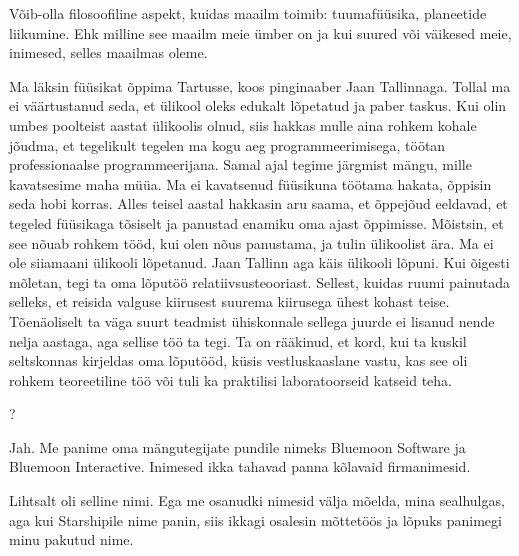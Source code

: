 
Võib-olla filosoofiline aspekt, kuidas 
maailm toimib: tuumafüüsika, planeetide liikumine. Ehk milline see maailm meie 
ümber on ja kui suured või väikesed meie, inimesed, selles maailmas oleme. 


Ma läksin füüsikat õppima Tartusse, koos pinginaaber Jaan 
Tallinnaga. Tollal ma ei väärtustanud seda, 
et ülikool oleks   
edukalt lõpetatud ja paber taskus. Kui olin umbes poolteist aastat ülikoolis 
olnud, siis hakkas mulle aina rohkem kohale jõudma, et tegelikult tegelen ma 
kogu aeg programmeerimisega, töötan professionaalse programmeerijana. 
Samal ajal tegime järgmist mängu, mille kavatsesime maha müüa. Ma ei kavatsenud 
füüsikuna töötama hakata, õppisin seda hobi 
korras. Alles teisel aastal hakkasin aru saama, et õppejõud eeldavad, 
et tegeled füüsikaga tõsiselt ja panustad enamiku oma ajast õppimisse. 
Mõistsin, et see nõuab rohkem 
tööd, kui olen nõus panustama, ja tulin ülikoolist ära. Ma ei ole siiamaani 
ülikooli lõpetanud. Jaan Tallinn aga käis ülikooli 
lõpuni. Kui õigesti mõletan, tegi ta oma lõputöö 
relatiivsusteooriast. Sellest, kuidas ruumi painutada selleks, et reisida 
valguse kiirusest suurema kiirusega ühest kohast teise. 
Tõenäoliselt ta väga suurt teadmist ühiskonnale sellega juurde 
ei lisanud nende nelja aastaga, aga sellise töö ta tegi. Ta 
on rääkinud, et kord, kui ta kuskil seltskonnas kirjeldas oma lõputööd, 
küsis vestluskaaslane vastu, kas see oli 
rohkem teoreetiline töö või tuli ka praktilisi laboratoorseid katseid teha.

\label{sisu!bluemoon}?

Jah. Me panime oma mängutegijate pundile nimeks Bluemoon 
Software ja Bluemoon Interactive. Inimesed ikka tahavad panna 
kõlavaid firmanimesid.


Lihtsalt oli selline nimi. Ega me osanudki nimesid välja mõelda, mina 
sealhulgas, aga kui Starshipile nime panin, siis ikkagi osalesin mõttetöös ja lõpuks panimegi 
minu pakutud nime.


